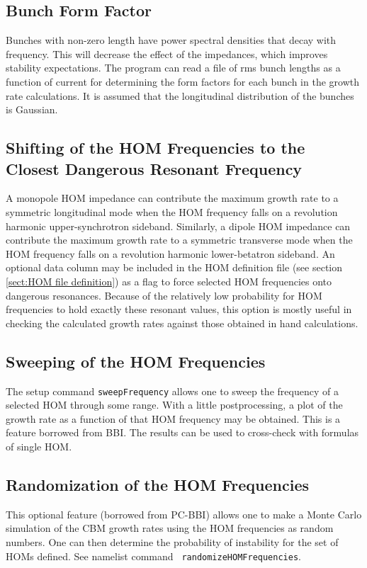 \documentclass[11pt]{article}
\begin{document}
\subsection{Bunch Form Factor} 

Bunches with non-zero length have power spectral densities that decay with
frequency. 
This will decrease the effect of the impedances, which improves stability
expectations. 
The program can read a file of rms bunch lengths as a function of
current for determining the form factors for each bunch in the growth rate
calculations. 
It is assumed that the longitudinal distribution of the bunches is
Gaussian.

\subsection{Shifting of the HOM Frequencies to the Closest Dangerous Resonant Frequency}
A monopole HOM impedance can contribute the maximum growth rate to a
symmetric longitudinal mode when the HOM frequency falls on a
revolution harmonic upper-synchrotron sideband.  Similarly, a dipole
HOM impedance can contribute the maximum growth rate to a symmetric
transverse mode when the HOM frequency falls on a revolution
harmonic lower-betatron sideband.  An optional data column may be
included in the HOM definition file (see section \ref{sect:HOM file
definition}) as a flag to force selected HOM frequencies onto dangerous
resonances.  Because of the relatively low probability for HOM
frequencies to hold exactly these resonant values, this option is
mostly useful in checking the calculated growth rates against those
obtained in hand calculations.

\subsection{Sweeping of the HOM Frequencies}
The setup command {\tt sweepFrequency} allows one to sweep the
frequency of a selected HOM through some range.  With a little
postprocessing, a plot of the growth rate as a function of that HOM
frequency may be obtained.  This is a feature borrowed from BBI.
The results can be used to cross-check with formulas of single HOM.

\subsection{Randomization of the HOM Frequencies}
This optional feature (borrowed from PC-BBI) allows one to make a
Monte Carlo simulation of the CBM growth rates using the HOM
frequencies as random numbers. One can then determine the probability
of instability for the set of HOMs defined. See namelist command {\tt
randomizeHOMFrequencies}.
\end{document}

